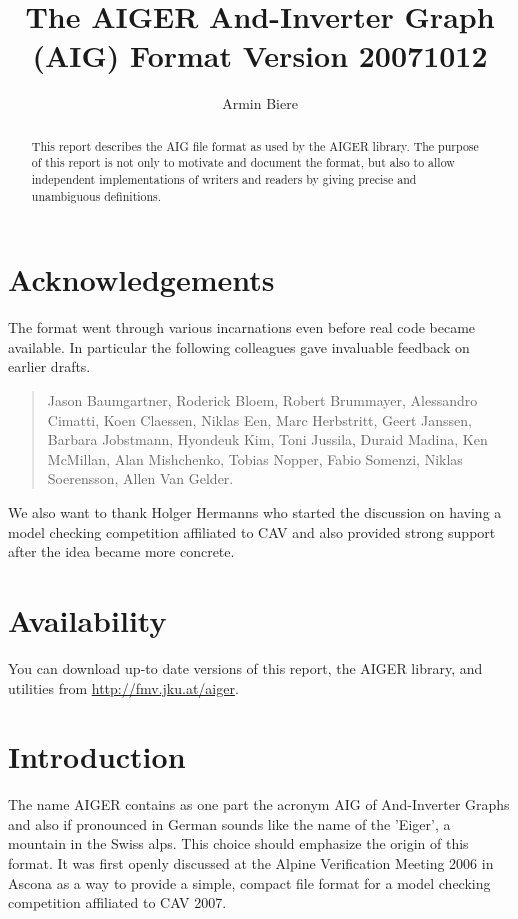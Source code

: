 \documentclass{llncs}
\title{The AIGER And-Inverter Graph (AIG) Format Version 20071012}
\author{Armin Biere}
\institute{Johannes Kepler University Linz, Austria}
\begin{document}
\maketitle
\thispagestyle{fancy}

\begin{abstract}
  This report describes the AIG file format as used by the AIGER library.
  The purpose of this report is not only to motivate and document the
  format, but also to allow independent implementations of writers and
  readers by giving precise and unambiguous definitions.
\end{abstract}

\section{Acknowledgements}

  The format went through various incarnations even before real code became
  available.  In particular the following colleagues gave invaluable
  feedback on earlier drafts.

\begin{quote}
      Jason Baumgartner, Roderick Bloem, Robert Brummayer, Alessandro
      Cimatti, Koen Claessen, Niklas Een, Marc Herbstritt, Geert Janssen,
      Barbara Jobstmann, Hyondeuk Kim, Toni Jussila, Duraid Madina,
      Ken McMillan, Alan Mishchenko, Tobias Nopper, Fabio Somenzi, 
      Niklas Soerensson, Allen Van Gelder.
\end{quote}

  We also want to thank Holger Hermanns who started the discussion on having
  a model checking competition affiliated to CAV and also provided strong
  support after the idea became more concrete.

\section{Availability}
  
  You can download up-to date versions of this report, the AIGER library,
  and utilities from \url{http://fmv.jku.at/aiger}.

\section{Introduction}

  The name AIGER contains as one part the acronym AIG of And-Inverter
  Graphs and also if pronounced in German sounds like the name of the
  'Eiger', a mountain in the Swiss alps.  This choice should emphasize the
  origin of this format. It was first openly discussed at the Alpine
  Verification Meeting 2006 in Ascona as a way to provide a simple, compact
  file format for a model checking competition affiliated to CAV 2007.
\end{document}
